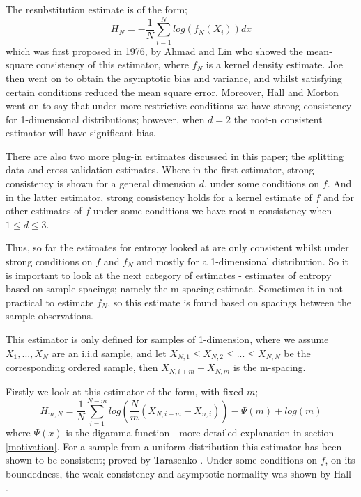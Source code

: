 \documentclass{article}
\begin{document}
The resubstitution estimate is of the form;
\begin{equation}
H_{N} = - \frac{1}{N}\sum_{i=1}^{N}  log ( f_{N}(X_{i}) )dx
\end{equation}
which was first proposed in 1976, by Ahmad and Lin \cite{resest1} who showed the mean-square consistency of this estimator, where  $f_{N}$ is a kernel density estimate. Joe \cite{intest2} then went on to obtain the asymptotic bias and variance, and whilst satisfying certain conditions reduced the mean square error. Moreover, Hall and Morton \cite{resest2} went on to say that under more restrictive conditions we have strong consistency for 1-dimensional distributions; however, when $d=2$ the root-n consistent estimator will have significant bias.

There are also two more plug-in estimates discussed in this paper; the splitting data and cross-validation estimates. Where in the first estimator, strong consistency is shown for a general dimension $d$, under some conditions on $f$. And in the latter estimator, strong consistency holds for a kernel estimate of $f$ and for other estimates of $f$ under some conditions we have root-n consistency when $1 \leq d \leq 3$.

Thus, so far the estimates for entropy looked at are only consistent whilst under strong conditions on $f$ and $f_{N}$ and mostly for a 1-dimensional distribution. So it is important to look at the next category of estimates - estimates of entropy based on sample-spacings; namely the m-spacing estimate. Sometimes it in not practical to estimate $f_{N}$, so this estimate is found based on spacings between the sample observations. 

This estimator is only defined for samples of 1-dimension, where we assume $X_{1}, ..., X_{N}$ are an i.i.d sample, and let $X_{N, 1} \leq X_{N, 2} \leq ... \leq X_{N, N}$ be the corresponding ordered sample, then $X_{N, i+m} - X_{N, m}$ is the m-spacing.

Firstly we look at this estimator of the form, with fixed $m$;
\begin{equation}
H_{m, N} = \frac{1}{N} \sum_{i=1}^{N-m} log \left(\frac{N}{m} (X_{N, i+m} - X_{n, i}) \right) - \Psi(m) + log(m)
\end{equation}
where $\Psi(x)$ is the digamma function - more detailed explanation in section \ref{motivation}. For a sample from a uniform distribution this estimator has been shown to be consistent; proved by Tarasenko \cite{spacest1}. Under some conditions on $f$, on its boundedness, the weak consistency and asymptotic normality was shown by Hall \cite{spacest2}.
\end{document}
